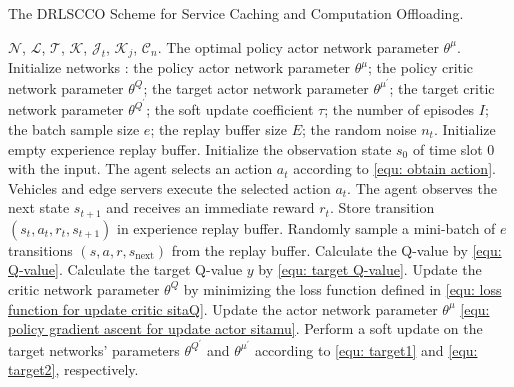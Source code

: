 \documentclass[lettersize,journal]{IEEEtran}
\begin{document}
\begin{algorithm}
	\caption{The DRLSCCO Scheme for Service Caching and Computation Offloading.}
	\label{alg: DRLSCCO}
	\renewcommand{\algorithmicrequire}{\textbf{ Input:}}
	\renewcommand{\algorithmicensure}{\textbf{ Output:}}
		\begin{algorithmic}[1]
		\REQUIRE  
		$ \mathcal{N} $, $ \mathcal{L} $, $ \mathcal{T} $, $ \mathcal{K} $, $ \mathcal{J}_{t} $, $ \mathcal{K}_{j} $, $ \mathcal{C}_{n} $.
		\ENSURE   
		The optimal policy actor network parameter $ \theta^{\mu} $.
		\STATE 
		Initialize networks :
		the policy actor network parameter $ \theta^{\mu} $;  
		the policy critic network parameter $ \theta^{Q} $; 
		the target actor network parameter $ \theta^{\mu^{\prime}} $;
		the target critic network parameter $ \theta^{Q^{\prime}} $;
		the soft update coefficient $ \tau $;
		the number of episodes $ I $;
		the batch sample size $ e $; 
		the replay buffer size $ E $;
		the random noise $ n_{t} $.
		\STATE Initialize empty experience replay buffer.
			\STATE Initialize the observation state $ s_0 $ of  time slot $ 0 $ with the input.
				\STATE The agent selects an action $ a_t $  according to \eqref{equ: obtain action}.
				\STATE Vehicles and edge servers execute the selected action $ a_t $.
				\STATE The agent observes the next state $ s_{t+1} $ and receives an immediate reward $ r_t $.
				\STATE Store transition $ (s_t, a_t, r_t, s_{t+1}) $ in experience replay buffer.
					\STATE Randomly sample a mini-batch of $ e $ transitions $ (s,a,r,s_{\text{next}}) $ from the replay buffer.
					\STATE Calculate the Q-value by \eqref{equ: Q-value}.
					\STATE Calculate the target Q-value $ y $ by \eqref{equ: target Q-value}.
					\STATE Update the critic network parameter $ \theta^{Q} $ by minimizing the loss function  defined in \eqref{equ: loss function for update critic sitaQ}.
					\STATE Update the actor network parameter $ \theta^{\mu} $  \eqref{equ: policy gradient ascent for update actor sitamu}.
					\STATE Perform a soft update on the target networks' parameters $ \theta^{Q^{\prime}} $ and $ \theta^{\mu^{\prime}} $ according to \eqref{equ: target1} and \eqref{equ: target2}, respectively.
				\ENDIF
			\ENDFOR
		\ENDFOR
		\end{algorithmic}
\end{algorithm}
\end{document}
